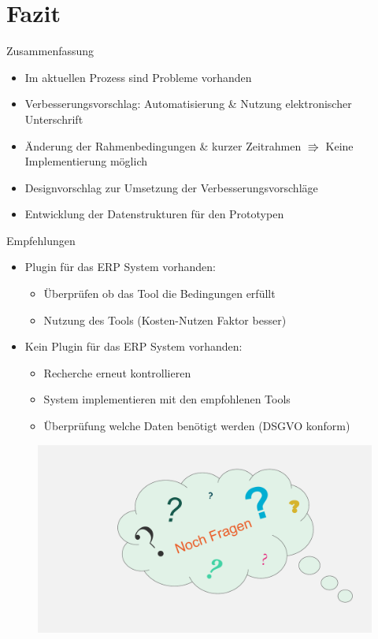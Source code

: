 \documentclass[utf8, xcolor, usenames,dvipsnames, aspectratio=169, notes, ]{beamer}
\begin{document}
\section{Fazit}

\begin{frame}{Zusammenfassung}
	\begin{itemize}
		\item Im aktuellen Prozess sind Probleme vorhanden
		\item Verbesserungsvorschlag: Automatisierung \& Nutzung elektronischer Unterschrift
		\item Änderung der Rahmenbedingungen \& kurzer Zeitrahmen \newline $\Rrightarrow$ Keine Implementierung möglich
		\item Designvorschlag zur Umsetzung der Verbesserungsvorschläge
		\item Entwicklung der Datenstrukturen für den Prototypen
	\end{itemize}
\end{frame}	

\begin{frame}{Empfehlungen}
	\begin{itemize}
		\item Plugin für das ERP System vorhanden:
		\begin{itemize}
			\item Überprüfen ob das Tool die Bedingungen erfüllt
			\item Nutzung des Tools (Kosten-Nutzen Faktor besser)
		\end{itemize}
		\item Kein Plugin für das ERP System vorhanden:
		\begin{itemize}
			\item Recherche erneut kontrollieren
			\item System implementieren mit den empfohlenen Tools
			\item Überprüfung welche Daten benötigt werden (DSGVO konform)
		\end{itemize}
	\end{itemize}
\end{frame}

\vspace*{-15mm}   
\begin{frame}
	\begin{figure}
		\hspace*{-15mm}
		\includegraphics[width=\paperwidth, height=\paperheight]{./images/questions.pdf}
	\end{figure}
\end{frame}
\end{document}

